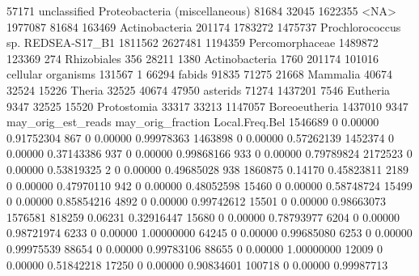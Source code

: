 \documentclass{article}
\begin{document}
\begin{Schunk}
\begin{Soutput}
57171   unclassified Proteobacteria (miscellaneous)   81684   32045
1622355                                        <NA> 1977087   81684
163469                               Actinobacteria  201174 1783272
1475737           Prochlorococcus sp. REDSEA-S17_B1 1811562 2627481
1194359                             Percomorphaceae 1489872  123369
274                                     Rhizobiales     356   28211
1380                                 Actinobacteria    1760  201174
101016                           cellular organisms  131567       1
66294                                        fabids   91835   71275
21668                                      Mammalia   40674   32524
15226                                        Theria   32525   40674
47950                                      asterids   71274 1437201
7546                                       Eutheria    9347   32525
15520                                   Protostomia   33317   33213
1147057                               Boreoeutheria 1437010    9347
        may_orig_est_reads may_orig_fraction Local.Freq.Bel
1546689                  0           0.00000     0.91752304
867                      0           0.00000     0.99978363
1463898                  0           0.00000     0.57262139
1452374                  0           0.00000     0.37143386
937                      0           0.00000     0.99868166
933                      0           0.00000     0.79789824
2172523                  0           0.00000     0.53819325
2                        0           0.00000     0.49685028
938                1860875           0.14170     0.45823811
2189                     0           0.00000     0.47970110
942                      0           0.00000     0.48052598
15460                    0           0.00000     0.58748724
15499                    0           0.00000     0.85854216
4892                     0           0.00000     0.99742612
15501                    0           0.00000     0.98663073
1576581             818259           0.06231     0.32916447
15680                    0           0.00000     0.78793977
6204                     0           0.00000     0.98721974
6233                     0           0.00000     1.00000000
64245                    0           0.00000     0.99685080
6253                     0           0.00000     0.99975539
88654                    0           0.00000     0.99783106
88655                    0           0.00000     1.00000000
12009                    0           0.00000     0.51842218
17250                    0           0.00000     0.90834601
100718                   0           0.00000     0.99987713

\end{Soutput}
\end{Schunk}
\end{document}
